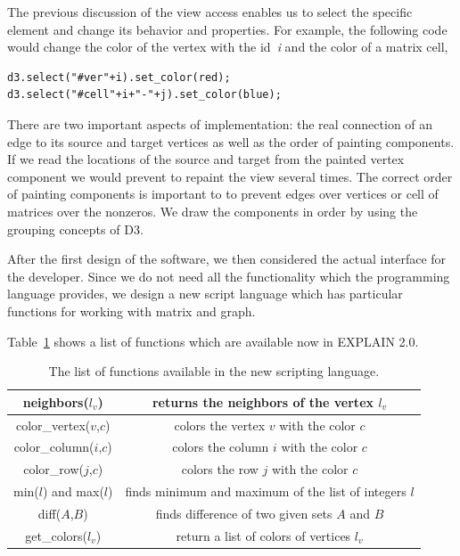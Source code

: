 \documentclass[12pt, twoside,a4paper,toc=bibliography]{scrbook}
\begin{document}
The previous discussion of the view access enables us to select the
specific element and change its behavior and properties. For example, the following
code would change the color of the vertex with the id~\textit{i} and the color
of a matrix cell,
\begin{lstlisting}
d3.select("#ver"+i).set_color(red);
d3.select("#cell"+i+"-"+j).set_color(blue);
\end{lstlisting}

There are two important aspects of implementation: the real connection 
of an edge to its source and target vertices as well as 
the order of painting components.
If we read the locations of the source and target from the painted vertex component
we would prevent to repaint the view several times.
The correct order of painting components is important to to prevent 
edges over vertices or cell of matrices over the nonzeros.
We draw the components in order by using the grouping concepts of D3.

After the first design of the software, we then considered the actual interface
for the developer. Since we do not need all the functionality which the
programming language provides, we design a new script language which
has particular functions for working with matrix and graph.

Table~\ref{command-table} shows a list of functions which are available
now in EXPLAIN 2.0.
\begin{table}
\begin{tabular}{ | c | c |}
\hline
neighbors($l_v$) & returns the neighbors of the vertex $l_v$ \\ \hline
color\_vertex($v$,$c$) & colors the vertex $v$ with the color $c$ \\\hline
color\_column($i$,$c$) & colors the column $i$ with the color $c$ \\\hline
color\_row($j$,$c$) & colors the row $j$ with the color $c$ \\\hline
min($l$) and max($l$) & finds minimum and maximum of the list of integers $l$ \\\hline
diff($A$,$B$) & finds difference of two given sets $A$ and $B$ \\\hline
get\_colors($l_v$) & return a list of colors of vertices $l_v$ \\\hline
\end{tabular}
\caption{The list of functions available in the new scripting language.}
\label{command-table}
\end{table}
\end{document}

